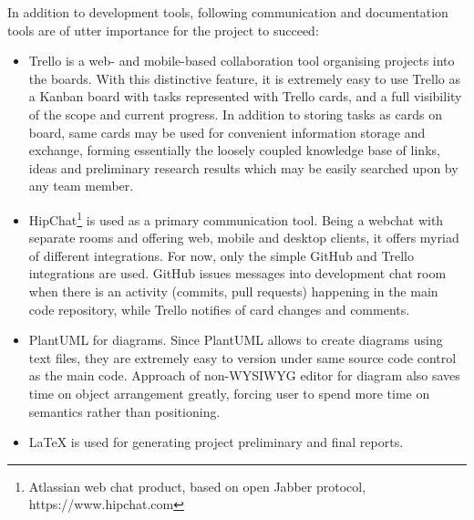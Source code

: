 In addition to development tools, following communication and documentation tools are of utter importance for the project to succeed:

\begin{itemize}
	\item Trello is a web- and mobile-based collaboration tool organising projects into the boards. With this distinctive feature, it is extremely easy to use Trello as a
	Kanban board with tasks represented with Trello cards, and a full visibility of the scope and current progress. In addition to storing tasks as cards on board, same cards
	may be used for convenient information storage and exchange, forming essentially the loosely coupled knowledge base of links, ideas and preliminary research
	results which may be easily searched upon by any team member.
	\item HipChat\footnote{Atlassian web chat product, based on open Jabber protocol, https://www.hipchat.com} is used as a primary communication tool. Being a webchat with separate rooms and offering web, mobile and desktop clients, it offers myriad of different integrations. For now, only the simple GitHub and Trello integrations are used. GitHub issues messages into development chat room when there is an activity (commits, pull requests) happening in the main code repository, while Trello notifies of card changes and comments. 
	\item PlantUML for diagrams. Since PlantUML allows to create diagrams using text files, they are extremely easy to version under same source code control as the main code. Approach of non-WYSIWYG editor for diagram also saves time on object arrangement greatly, forcing user to spend more time on semantics rather than positioning.
	\item LaTeX is used for generating project preliminary and final reports.
\end{itemize}


